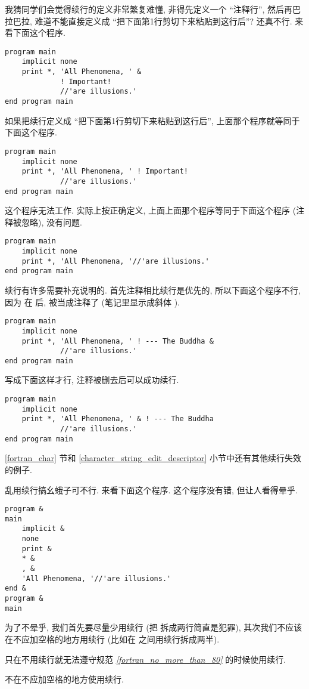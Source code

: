 我猜同学们会觉得续行的定义非常繁复难懂, 非得先定义一个 ``注释行'', 然后再巴拉巴拉, 难道不能直接定义成 ``把下面第1行剪切下来粘贴到这行后''? 还真不行. 来看下面这个程序.
\begin{lstlisting}
program main
    implicit none
    print *, 'All Phenomena, ' &
             ! Important!
             //'are illusions.'
end program main
\end{lstlisting}
如果把续行定义成 ``把下面第1行剪切下来粘贴到这行后'', 上面那个程序就等同于下面这个程序.
\begin{lstlisting}
program main
    implicit none
    print *, 'All Phenomena, ' ! Important!
             //'are illusions.'
end program main
\end{lstlisting}
这个程序无法工作. 实际上按正确定义, 上面上面那个程序等同于下面这个程序 (注释被忽略), 没有问题.
\begin{lstlisting}
program main
    implicit none
    print *, 'All Phenomena, '//'are illusions.'
end program main
\end{lstlisting}

续行有许多需要补充说明的. 首先注释相比续行是优先的, 所以下面这个程序不行, 因为 \ttt{\&{}} 在 \ttt{!} 后, 被当成注释了 (笔记里显示成斜体 \emph{\ttt{\&{}}}).
\begin{lstlisting}
program main
    implicit none
    print *, 'All Phenomena, ' ! --- The Buddha &
             //'are illusions.'
end program main
\end{lstlisting}
写成下面这样才行, 注释被删去后可以成功续行.
\begin{lstlisting}
program main
    implicit none
    print *, 'All Phenomena, ' & ! --- The Buddha
             //'are illusions.'
end program main
\end{lstlisting}
\ref{fortran_char} 节和 \ref{character_string_edit_descriptor} 小节中还有其他续行失效的例子.

乱用续行搞幺蛾子可不行. 来看下面这个程序. 这个程序没有错, 但让人看得晕乎.
\begin{lstlisting}
program &
main
    implicit &
    none
    print &
    * &
    , & 
    'All Phenomena, '//'are illusions.'
end &
program &
main
\end{lstlisting}
为了不晕乎, 我们首先要尽量少用续行 (把  拆成两行简直是犯罪), 其次我们不应该在不应加空格的地方用续行 (比如在 \ttt{*,} 之间用续行拆成两半).
\begin{convention}
    只在不用续行就无法遵守规范 \emph{\ref{fortran_no_more_than_80}} 的时候使用续行.
\end{convention}
\begin{convention}
    不在不应加空格的地方使用续行.
\end{convention}

